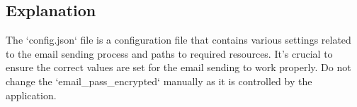 \documentclass{article}
\begin{document}
	\subsection*{Explanation}
	The `config.json` file is a configuration file that contains various settings related to the email sending process and paths to required resources. It's crucial to ensure the correct values are set for the email sending to work properly. Do not change the `email\_pass\_encrypted` manually as it is controlled by the application.
	
\end{document}
